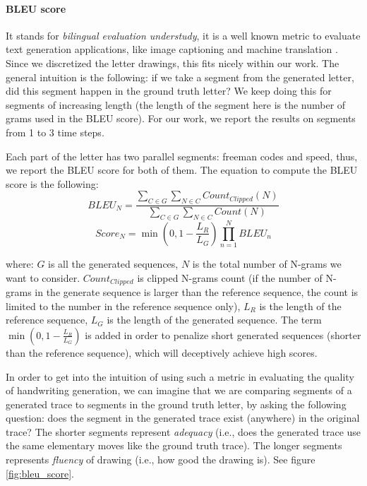 \paragraph{BLEU score} It stands for \textit{bilingual evaluation understudy}, it is a well known metric to evaluate text generation applications, like image captioning \citep{karpathy2015deep,vinyals2015show} and machine translation \citep{Sutskever:2014:SSL:2969033.2969173}. Since we discretized the letter drawings, this fits nicely within our work. The general intuition is the following: if we take a segment from the generated letter, did this segment happen in the ground truth letter? We keep doing this for segments of increasing length (the length of the segment here is the number of grams used in the BLEU score). For our work, we report the results on segments from 1 to 3 time steps.

Each part of the letter has two parallel segments: freeman codes and speed, thus, we report the BLEU score for both of them.
The equation to compute the BLEU score is the following:
\begin{equation}
BLEU_{N} = \frac{\sum_{C\in G}\sum_{N\in C}Count_{Clipped}(N)}{\sum_{C\in G}\sum_{N\in C}Count(N)}
\end{equation}
\begin{equation}
Score_{N} = \min{(0, 1 - \frac{L_{R}}{L_{G}})} \prod^{N}_{n=1}BLEU_{n}
\end{equation}

where: $G$ is all the generated sequences, $N$ is the total number of N-grams we want to consider. $Count_{Clipped}$ is clipped N-grams count (if the number of N-grams in the generate sequence is larger than the reference sequence, the count is limited to the number in the reference sequence only), $L_R$ is the length of the reference sequence, $L_G$ is the length of the generated sequence.
The term $\min(0, 1 - \frac{L_{R}}{L_{G}})$ is added in order to penalize short generated sequences (shorter than the reference sequence), which will deceptively achieve high scores.

\par In order to get into the intuition of using such a metric in evaluating the quality of handwriting generation, we can imagine that we are comparing segments of a generated trace to segments in the ground truth letter, by asking the following question: does the segment in the generated trace exist (anywhere) in the original trace? The shorter segments represent \textit{adequacy} (i.e., does the generated trace use the same elementary moves like the ground truth trace). The longer segments represents \textit{fluency} of drawing (i.e., how good the drawing is). See figure \ref{fig:bleu_score}.

